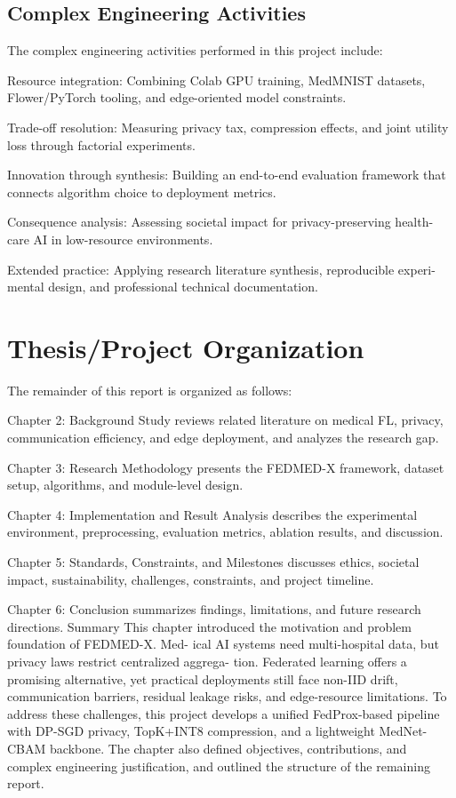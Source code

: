 \subsection{Complex Engineering Activities}
The complex engineering activities performed in this project include:
\item Resource integration: Combining Colab GPU training, MedMNIST datasets,
Flower/PyTorch tooling, and edge-oriented model constraints.
\item Trade-off resolution: Measuring privacy tax, compression effects, and joint utility loss through factorial experiments.
\item Innovation through synthesis: Building an end-to-end evaluation framework that connects algorithm choice to deployment metrics.
\item Consequence analysis: Assessing societal impact for privacy-preserving health- care AI in low-resource environments.
\item Extended practice: Applying research literature synthesis, reproducible experi- mental design, and professional technical documentation.

\section{Thesis/Project Organization}
The remainder of this report is organized as follows:
\item Chapter 2: Background Study reviews related literature on medical FL, privacy, communication efficiency, and edge deployment, and analyzes the research gap.
\item Chapter 3: Research Methodology presents the FEDMED-X framework, dataset setup, algorithms, and module-level design.
\item Chapter 4: Implementation and Result Analysis describes the experimental environment, preprocessing, evaluation metrics, ablation results, and discussion.
\item Chapter 5: Standards, Constraints, and Milestones discusses ethics, societal impact, sustainability, challenges, constraints, and project timeline.
\item Chapter 6:
Conclusion summarizes findings, limitations, and future research directions.
Summary
This chapter introduced the motivation and problem foundation of FEDMED-X. Med- ical AI systems need multi-hospital data, but privacy laws restrict centralized aggrega- tion. Federated learning offers a promising alternative, yet practical deployments still face non-IID drift, communication barriers, residual leakage risks, and edge-resource limitations. To address these challenges, this project develops a unified FedProx-based pipeline with DP-SGD privacy, TopK+INT8 compression, and a lightweight MedNet-
CBAM backbone.
The chapter also defined objectives, contributions, and complex engineering justification, and outlined the structure of the remaining report.

